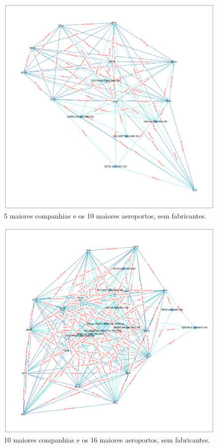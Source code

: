 \documentclass{article}
\begin{document}
\begin{figure}[H]
    \centering
    \includegraphics[width = \textwidth]{Imagens/5-10-0.png}
    \caption{5 maiores companhias e os 10 maiores aeroportos, sem fabricantes.}
    \label{view1}
\end{figure}

\begin{figure}[H]
    \centering
    \includegraphics[width = \textwidth]{Imagens/10-16-0.png}
    \caption{10 maiores companhias e os 16 maiores aeroportos, sem fabricantes.}
    \label{view2}
\end{figure}
\end{document}
